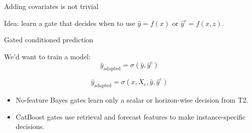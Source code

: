 \begin{frame}{Adding covariates is not trivial}



Idea: learn a gate that decides when to use $\hat{y}=f(x)$ or $\hat{y}^c=f(x,z)$.

\end{frame}

\begin{frame}{Gated conditioned prediction}

We'd want to train a model:
\[ \hat y_{\mathrm{adapted}} = \sigma(\hat{y},\hat{y}^c) \]

\[ \hat y_{\mathrm{adapted}} = \sigma(x,X_c, \hat{y},\hat{y}^c) \]

\begin{itemize}
    \item No-feature Bayes gates learn only a scalar or horizon-wise decision from T2.
    \item CatBoost gates use retrieval and forecast features to make instance-specific decisions.
\end{itemize}

    
\end{frame}


